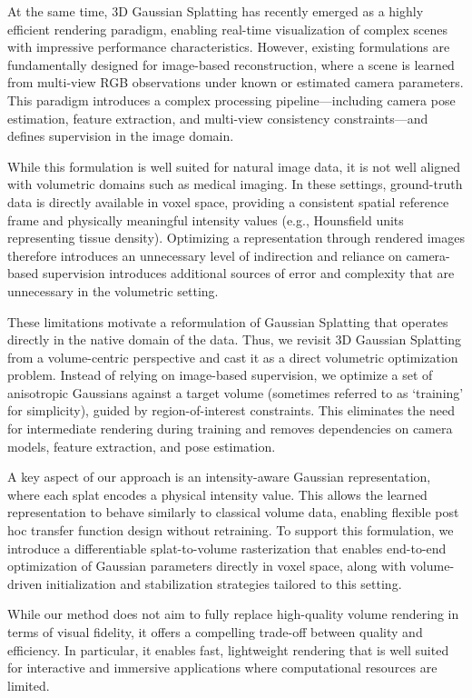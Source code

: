 \documentclass[runningheads]{llncs}
\begin{document}
At the same time, 3D Gaussian Splatting \cite{kerbl2023gaussiansplatting} has recently emerged as a highly efficient rendering paradigm, enabling real-time visualization of complex scenes with impressive performance characteristics. However, existing formulations are fundamentally designed for image-based reconstruction, where a scene is learned from multi-view RGB observations under known or estimated camera parameters. This paradigm introduces a complex processing pipeline—including camera pose estimation, feature extraction, and multi-view consistency constraints—and defines supervision in the image domain.

While this formulation is well suited for natural image data, it is not well aligned with volumetric domains such as medical imaging. In these settings, ground-truth data is directly available in voxel space, providing a consistent spatial reference frame and physically meaningful intensity values (e.g., Hounsfield units representing tissue density). Optimizing a representation through rendered images therefore introduces an unnecessary level of indirection and reliance on camera-based supervision introduces additional sources of error and complexity that are unnecessary in the volumetric setting.

These limitations motivate a reformulation of Gaussian Splatting that operates directly in the native domain of the data. Thus, we revisit 3D Gaussian Splatting from a volume-centric perspective and cast it as a direct volumetric optimization problem. Instead of relying on image-based supervision, we optimize a set of anisotropic Gaussians against a target volume (sometimes referred to as ‘training’ for simplicity), guided by region-of-interest constraints. This eliminates the need for intermediate rendering during training and removes dependencies on camera models, feature extraction, and pose estimation.

A key aspect of our approach is an intensity-aware Gaussian representation, where each splat encodes a physical intensity value. This allows the learned representation to behave similarly to classical volume data, enabling flexible post hoc transfer function design without retraining. To support this formulation, we introduce a differentiable splat-to-volume rasterization that enables end-to-end optimization of Gaussian parameters directly in voxel space, along with volume-driven initialization and stabilization strategies tailored to this setting.

While our method does not aim to fully replace high-quality volume rendering in terms of visual fidelity, it offers a compelling trade-off between quality and efficiency. In particular, it enables fast, lightweight rendering that is well suited for interactive and immersive applications where computational resources are limited.
\end{document}

